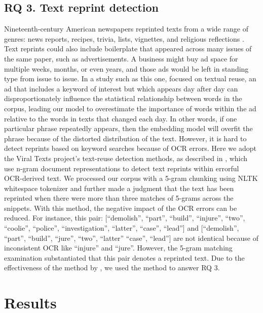 \documentclass[11pt]{article}
\begin{document}
\subsection{RQ 3. Text reprint detection}

Nineteenth-century American newspapers reprinted texts 
from a wide range of genres: news reports, recipes, trivia, lists, vignettes, 
and religious reflections \citep{cordell2017fugitive}. 
Text reprints could also include boilerplate that appeared across many issues of the same paper, 
such as advertisements. 
A business might buy ad space for multiple weeks, months, or even years, 
and those ads would be left 
in standing type from issue to issue. In a study such as this one, focused on textual reuse,
an ad that includes a keyword of interest 
but which appears day after day can disproportionately influence the statistical 
relationship between words in the corpus, 
leading our model to overestimate the importance of words within the ad relative
to the words in texts that changed each day. 
In other words, if one particular phrase repeatedly appears, then the 
embedding model will overfit the phrase because of 
the distorted distribution of the text. However, it is hard to detect reprints based on keyword searches because of OCR errors. 
Here we adopt the Viral Texts project's text-reuse detection methods, as described in \citet{smith2014detecting} , which use n-gram document representations 
to detect text reprints 
within errorful OCR-derived text. We processed our corpus with a 5-gram chunking 
using NLTK whitespace tokenizer and further made a judgment 
that the text has been reprinted when there were more than 
three matches of 5-grams across the snippets. 
With this method, the negative impact of the OCR errors can be reduced.
For instance, this pair: [``demolish'', ``part'', ``build'', ``injure'', ``two'', ``coolie'', ``police'', ``investigation'', 
``latter'', ``case'', ``lead''] and [``demolish'', ``part'', ``build'', ``jure'', ``two'', ``latter'' 
``case'', ``lead''] are not identical because of inconsistent OCR like ``injure'' and ``jure''.
However, the 5-gram matching examination substantiated that this pair denotes a reprinted text. 
Due to the effectiveness of the method by \citet{smith2014detecting}, 
we used the method to answer RQ 3.

\section{Results} \label{sec:results}
\end{document}
